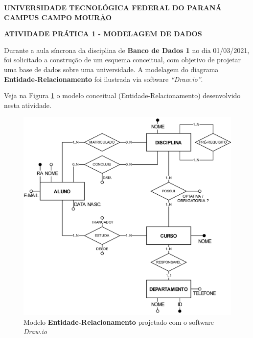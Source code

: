 \documentclass[a4paper, 12pt]{article}
\begin{document}
	
	\hspace{0.3cm}
	
	\begin{large}
		\begin{center}
			\textbf{UNIVERSIDADE TECNOLÓGICA FEDERAL DO PARANÁ}\newline
			\textbf{CAMPUS CAMPO MOURÃO}
		\end{center}
	\end{large}
	
	\vspace{0.3cm}
	
	\begin{center}
		\textbf{ATIVIDADE PRÁTICA 1 - MODELAGEM DE DADOS}
	\end{center}

	\vspace{0.3cm}
	
	\onehalfspacing
	Durante a aula síncrona da disciplina de \textbf{Banco de Dados 1} no dia 01/03/2021, foi solicitado a construção de um esquema conceitual, com objetivo de projetar uma base de dados sobre uma universidade. A modelagem do diagrama \textbf{Entidade-Relacionamento} foi ilustrada via software \textit{``Draw.io''}.
	
	Veja na Figura \ref{modeloER} o modelo conceitual (Entidade-Relacionamento) desenvolvido nesta atividade.
	
	\begin{figure}[H]
		\centering
		\includegraphics[scale=1.25]{resolucao.png}
				\caption{Modelo \textbf{Entidade-Relacionamento} projetado com o software \textit{Draw.io}}
		\label{modeloER}
	\end{figure}
	
\end{document}
